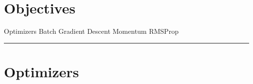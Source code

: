 
\section*{Objectives}
\begin{outline}
    \1 Optimizers 
    \1 Batch Gradient Descent
    \1 Momentum
    \1 RMSProp
\end{outline}

\rule[0.0051in]{\textwidth}{0.00025in}
\section{Optimizers}
